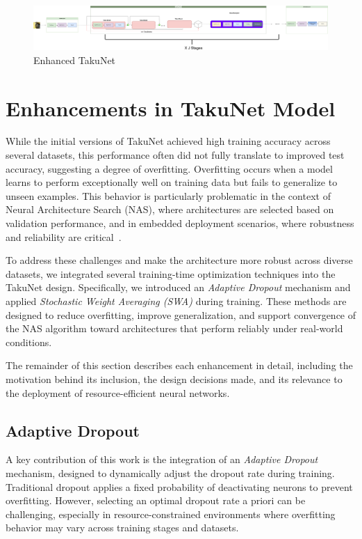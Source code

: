 \begin{figure}[ht]
    \centering
    \includegraphics[width=\linewidth]{Pictures/TakuNet.png}
    \caption{Enhanced TakuNet}
    \label{fig:TakuNet}
\end{figure}





\section{Enhancements in TakuNet Model}


While the initial versions of TakuNet achieved high training accuracy across several datasets, this performance often did not fully translate to improved test accuracy, suggesting a degree of overfitting. Overfitting occurs when a model learns to perform exceptionally well on training data but fails to generalize to unseen examples. This behavior is particularly problematic in the context of Neural Architecture Search (NAS), where architectures are selected based on validation performance, and in embedded deployment scenarios, where robustness and reliability are critical~\cite{Goodfellow-et-al-2016}.


To address these challenges and make the architecture more robust across diverse datasets, we integrated several training-time optimization techniques into the TakuNet design. Specifically, we introduced an \textit{Adaptive Dropout} mechanism and applied \textit{Stochastic Weight Averaging (SWA)} during training. These methods are designed to reduce overfitting, improve generalization, and support convergence of the NAS algorithm toward architectures that perform reliably under real-world conditions.

The remainder of this section describes each enhancement in detail, including the motivation behind its inclusion, the design decisions made, and its relevance to the deployment of resource-efficient neural networks.


\subsection{Adaptive Dropout}

A key contribution of this work is the integration of an \textit{Adaptive Dropout} mechanism, designed to dynamically adjust the dropout rate during training. Traditional dropout applies a fixed probability of deactivating neurons to prevent overfitting. However, selecting an optimal dropout rate a priori can be challenging, especially in resource-constrained environments where overfitting behavior may vary across training stages and datasets.

